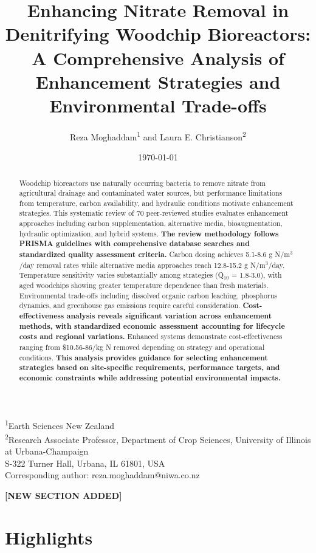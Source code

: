 \documentclass[12pt,a4paper]{article}
\title{Enhancing Nitrate Removal in Denitrifying Woodchip Bioreactors: A Comprehensive Analysis of Enhancement Strategies and Environmental Trade-offs \added{- Revised}}
\author{Reza Moghaddam\textsuperscript{1} and Laura E. Christianson\textsuperscript{2}}
\date{\today}
\newcommand{\added}[1]{\textcolor{addedtext}{\textbf{#1}}}
\begin{document}
\maketitle

\begin{center}
\footnotesize
\textsuperscript{1}Earth Sciences New Zealand\\
\textsuperscript{2}Research Associate Professor, Department of Crop Sciences, University of Illinois at Urbana-Champaign\\
S-322 Turner Hall, Urbana, IL 61801, USA\\
Corresponding author: reza.moghaddam@niwa.co.nz
\end{center}

\begin{abstract}
Woodchip bioreactors use naturally occurring bacteria to remove nitrate from agricultural drainage and contaminated water sources, but performance limitations from temperature, carbon availability, and hydraulic conditions motivate enhancement strategies. This systematic review of 70 peer-reviewed studies evaluates enhancement approaches including carbon supplementation, alternative media, bioaugmentation, hydraulic optimization, and hybrid systems. \added{The review methodology follows PRISMA guidelines with comprehensive database searches and standardized quality assessment criteria.} Carbon dosing achieves 5.1-8.6 g N/m$^3$/day removal rates while alternative media approaches reach 12.8-15.2 g N/m$^3$/day. Temperature sensitivity varies substantially among strategies (Q$_{10}$ = 1.8-3.0), with aged woodchips showing greater temperature dependence than fresh materials. Environmental trade-offs including dissolved organic carbon leaching, phosphorus dynamics, and greenhouse gas emissions require careful consideration. \added{Cost-effectiveness analysis reveals significant variation across enhancement methods, with standardized economic assessment accounting for lifecycle costs and regional variations.} Enhanced systems demonstrate cost-effectiveness ranging from \$10.56-86/kg N removed depending on strategy and operational conditions. \added{This analysis provides guidance for selecting enhancement strategies based on site-specific requirements, performance targets, and economic constraints while addressing potential environmental impacts.}
\end{abstract}

\textcolor{addedtext}{\textbf{[NEW SECTION ADDED]}}
\section*{Highlights}
\end{document}
